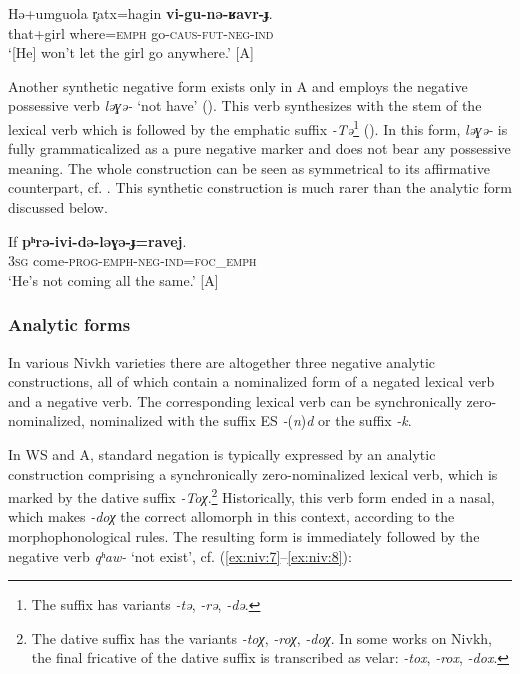 \documentclass[output=paper,colorlinks,citecolor=brown]{langscibook}
\begin{document}
\ea\label{ex:niv:5}
    \gll  Hə+umguola r̥atx=hagin \textbf{vi-gu-nə{}-ʁavr-ɟ}. \\ 
          that+girl where=\textsc{emph} go-\textsc{caus-fut-neg-ind} \\
    \glt ‘[He] won’t let the girl go anywhere.’ \citep[160]{Panfilov1965} [A]
\z 

Another synthetic negative form exists only in A and employs the negative possessive verb \textit{ləɣə{}-} ‘not have’ (). This verb synthesizes with the stem of the lexical verb which is followed by the emphatic suffix \textit{-Tə}\footnote{The suffix has variants \textit{-tə}, \textit{-rə}, \textit{-də}.} (). In this form, \textit{ləɣə{}-} is fully grammaticalized as a pure negative marker and does not bear any possessive meaning. The whole construction can be seen as symmetrical to its affirmative counterpart, cf. . This synthetic construction is much rarer than the analytic form discussed below.

\ea\label{ex:niv:6}
    \gll If \textbf{pʰrə{}-ivi-də{}-ləɣə{}-ɟ=ravej}. \\ 
         \textsc{3sg} come-\textsc{prog-emph-neg-ind=foc\_emph} \\
    \glt ‘He’s not coming all the same.’ \citep[160]{Panfilov1965} [A]
\z 

\subsubsection{Analytic forms}\label{sec:niv:2.1.2}

In various Nivkh varieties there are altogether three negative analytic constructions, all of which contain a nominalized form of a negated lexical verb and a negative verb. The corresponding lexical verb can be synchronically zero-nominalized, nominalized with the suffix ES \textit{-}(\textit{n})\textit{d} or the suffix \textit{-k}.

In WS and A, standard negation is typically expressed by an analytic construction comprising a synchronically zero-nominalized lexical verb, which is marked by the dative suffix \textit{-Toχ}.\footnote{The dative suffix has the variants \textit{-toχ}, \textit{-roχ}, \textit{-doχ}. In some works on Nivkh, the final fricative of the dative suffix is transcribed as velar: \textit{-tox}, \textit{-rox}, \textit{-dox}.} Historically, this verb form ended in a nasal, which makes \textit{-doχ} the correct allomorph in this context, according to the morphophonological rules. The resulting form is immediately followed by the negative verb \textit{qʰaw{}-} ‘not exist’, cf. (\ref{ex:niv:7}--\ref{ex:niv:8}):
\end{document}
